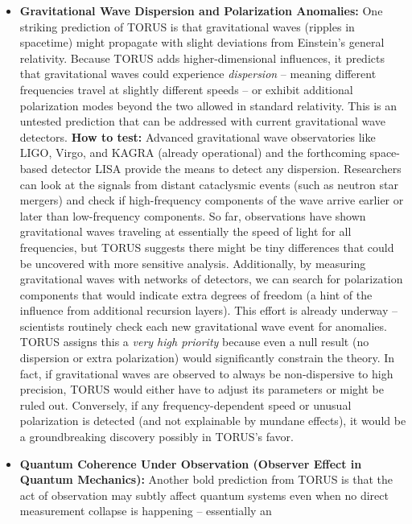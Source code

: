 \documentclass[
]{article}
\begin{document}
{\begin{itemize}
\item
  \textbf{Gravitational Wave Dispersion and Polarization Anomalies:} One
  striking prediction of TORUS is that gravitational waves (ripples in
  spacetime) might propagate with slight deviations from Einstein's
  general relativity. Because TORUS adds higher-dimensional influences,
  it predicts that gravitational waves could experience
  \emph{dispersion} -- meaning different frequencies travel at slightly
  different speeds -- or exhibit additional polarization modes beyond
  the two allowed in standard relativity. This is an untested prediction
  that can be addressed with current gravitational wave detectors.
  \textbf{How to test:} Advanced gravitational wave observatories like
  LIGO, Virgo, and KAGRA (already operational) and the forthcoming
  space-based detector LISA provide the means to detect any dispersion.
  Researchers can look at the signals from distant cataclysmic events
  (such as neutron star mergers) and check if high-frequency components
  of the wave arrive earlier or later than low-frequency components. So
  far, observations have shown gravitational waves traveling at
  essentially the speed of light for all frequencies, but TORUS suggests
  there might be tiny differences that could be uncovered with more
  sensitive analysis\hspace{0pt}. Additionally, by measuring
  gravitational waves with networks of detectors, we can search for
  polarization components that would indicate extra degrees of freedom
  (a hint of the influence from additional recursion layers). This
  effort is already underway -- scientists routinely check each new
  gravitational wave event for anomalies. TORUS assigns this a
  \emph{very high priority} because even a null result (no dispersion or
  extra polarization) would significantly constrain the
  theory\hspace{0pt}. In fact, if gravitational waves are observed to
  always be non-dispersive to high precision, TORUS would either have to
  adjust its parameters or might be ruled out. Conversely, if any
  frequency-dependent speed or unusual polarization is detected (and not
  explainable by mundane effects), it would be a groundbreaking
  discovery possibly in TORUS's favor.
\item
  \textbf{Quantum Coherence Under Observation (Observer Effect in
  Quantum Mechanics):} Another bold prediction from TORUS is that the
  act of observation may subtly affect quantum systems even when no
  direct measurement collapse is happening -- essentially an

\end{itemize}}
\end{document}
